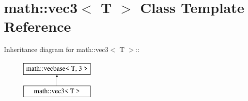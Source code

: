 \hypertarget{classmath_1_1vec3}{
\section{math::vec3$<$ T $>$ Class Template Reference}
\label{classmath_1_1vec3}
}
Inheritance diagram for math::vec3$<$ T $>$::\begin{figure}[H]
\begin{center}
\leavevmode
\includegraphics[height=2cm]{classmath_1_1vec3}
\end{center}
\end{figure}
